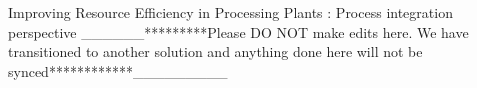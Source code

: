 Improving Resource Efficiency in Processing Plants : Process integration perspective ______*********Please DO NOT make edits here. We have transitioned to another solution and anything done here will not be synced************_________